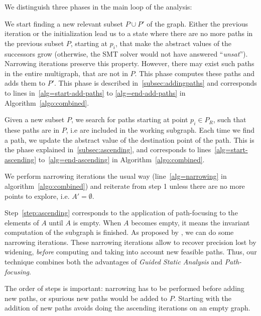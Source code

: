 \documentclass{llncs}
\begin{document}
We distinguish three phases in the main loop of the analysis:
\begin{compactenum}
\item \label{step:addingpaths} We start finding a new relevant subset
  $P \cup P'$ of the graph.
  Either the previous iteration or the initialization lead us to a
  state where there are no more paths in the previous subset $P$,
  starting at $p_i$, that make the abstract values of the successors
  grow (otherwise, the SMT solver would not have answered
  ``\emph{unsat}''). Narrowing iterations preserve this property.
  However, there may exist such paths in the entire multigraph, that
  are not in $P$. This phase computes these paths and adds them to
  $P'$. This phase is described in~\ref{subsec:addingpaths}
  and corresponds to lines in~\ref{alg=start-add-paths} to
  \ref{alg=end-add-paths} in Algorithm~\ref{algo:combined}.
\item \label{step:ascending} Given a new subset $P$, we search for paths starting at point
  $p_i \in P_R$, such that these paths are in $P$, i.e are included in
  the working subgraph. Each time we find a path, we update the
  abstract value of the destination point of the path. This is the
  phase explained in~\ref{subsec:ascending}, and corresponds to
  lines~\ref{alg=start-ascending} to~\ref{alg=end-ascending} in
  Algorithm~\ref{algo:combined}.
\item  \label{step:narrowing} We perform narrowing iterations the usual way
  (line~\ref{alg=narrowing} in algorithm~\ref{algo:combined}) and
  reiterate from step 1 unless there are no more points to explore,
  i.e. $A' = \emptyset$.
\end{compactenum}

Step~\ref{step:ascending} corresponds to the application of
path-focusing \cite{Monniaux_Gonnord_SAS11} to
the elements of $A$ until $A$ is empty. 
When $A$ becomes empty, it means the
invariant computation of the subgraph is finished. As proposed by
\cite{DBLP:conf/sas/GopanR07}, we can do some narrowing iterations.
These narrowing iterations allow to recover precision lost by
widening, \emph{before} computing and taking into account new feasible paths.
Thus, our technique combines both the advantages of \emph{Guided Static
Analysis} and \emph{Path-focusing}.

The order of steps is important: narrowing has to be performed before
adding new paths, or spurious new paths would be added to $P$.
Starting with the addition of new paths avoids
doing the ascending iterations on an empty graph.
\end{document}
